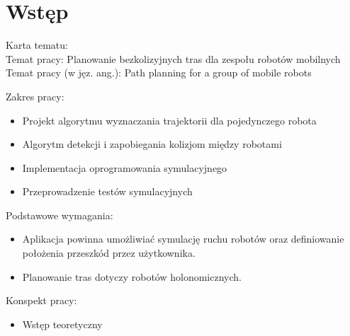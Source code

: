 \chapter{Wstęp}
\label{ch:wstep}

Karta tematu: \\
Temat pracy: Planowanie bezkolizyjnych tras dla zespołu robotów mobilnych \\
Temat pracy (w jęz. ang.): Path planning for a group of mobile robots

Zakres pracy:
\begin{itemize}
	\item Projekt algorytmu wyznaczania trajektorii dla pojedynczego robota
	\item Algorytm detekcji i zapobiegania kolizjom między robotami
	\item Implementacja oprogramowania symulacyjnego
	\item Przeprowadzenie testów symulacyjnych
\end{itemize}

Podstawowe wymagania:
\begin{itemize}
	\item Aplikacja powinna umożliwiać symulację ruchu robotów oraz definiowanie położenia przeszkód przez użytkownika.
	\item Planowanie tras dotyczy robotów holonomicznych.
\end{itemize}

Konspekt pracy:
\begin{itemize}
	\item Wstęp teoretyczny
\end{itemize}
